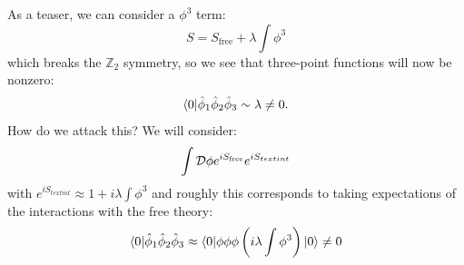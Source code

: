 As a teaser, we can consider a $\phi^3$ term:
\begin{equation}
    S = S_{\text{free}} + \lambda\int \phi^3
\end{equation}
which breaks the $\mathbb{Z}_2$ symmetry, so we see that three-point functions will now be nonzero:
\begin{equation}
    \langle 0 \rvert\hat{\phi}_1\hat{\phi}_2\hat{\phi}_3 \sim \lambda \neq 0.
\end{equation}
How do we attack this? We will consider:
\begin{equation}
    \int \mathcal{D} \phi e^{iS_{\text{free}}}e^{iS_{text{int}}}
\end{equation}
with $e^{iS_{text{int}}} \approx 1+ i\lambda \int \phi^3$ and roughly this corresponds to taking expectations of the interactions with the free theory:
\begin{equation}
    \langle 0 \rvert\hat{\phi}_1\hat{\phi}_2\hat{\phi}_3 \approx \langle 0 \rvert\phi\phi\phi \left(i\lambda \int \phi^3 \right)\lvert 0 \rangle \neq 0 
\end{equation}